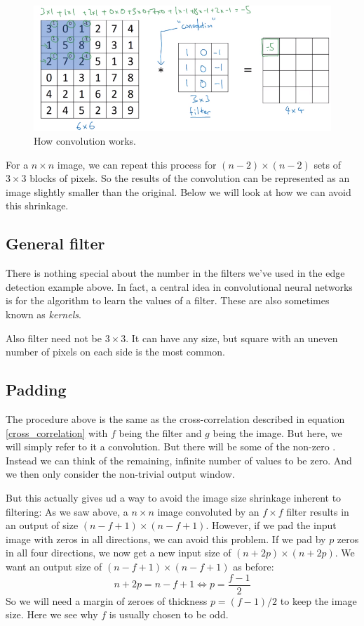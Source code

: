 \documentclass[12pt, a4paper]{article}
\numberwithin{equation}{section}
\begin{document}
\begin{figure}
\centering
\includegraphics[width=\textwidth]{convolutional_filter}
\caption{How convolution works.}
\label{fig:convolutional_filter}
\end{figure}

For a $n\times n$ image, we can repeat this process for $(n-2)\times(n-2)$ sets of $3\times 3$ blocks of pixels. So the results of the convolution can be represented as an image slightly smaller than the original. Below we will look at how we can avoid this shrinkage.

\subsection{General filter}
There is nothing special about the number in the filters we've used in the edge detection example above. In fact, a central idea in convolutional neural networks is for the algorithm to learn the values of a filter. These are also sometimes known as \textit{kernels}.

Also filter need not be $3\times 3$. It can have any size, but square with an uneven number of pixels on each side is the most common.

\subsection{Padding}
The procedure above is the same as the cross-correlation described in equation \ref{cross_correlation} with $f$ being the filter and $g$ being the image. But here, we will simply refer to it a convolution. But there will be some of the non-zero . Instead we can think of the remaining, infinite number of values to be zero. And we then only consider the non-trivial output window.

But this actually gives ud a way to avoid the image size shrinkage inherent to filtering: As we saw above, a $n\times n$ image convoluted by an $f\times f$ filter results in an output of size $(n-f+1)\times(n-f+1)$. However, if we pad the input image with zeros in all directions, we can avoid this problem. If we pad by $p$ zeros in all four directions, we now get a new input size of $(n+2p)\times(n+2p)$. We want an output size of $(n-f+1)\times(n-f+1)$ as before:
\begin{equation}
n+2p=n-f+1\Leftrightarrow p=\frac{f-1}{2}
\end{equation}
So we will need a margin of zeroes of thickness $p=(f-1)/2$ to keep the image size. Here we see why $f$ is usually chosen to be odd.
\end{document}
